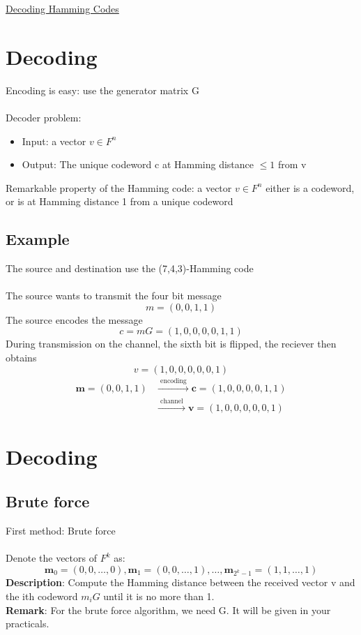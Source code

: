 \documentclass{article}[18pt]
\begin{document}
\begin{center}
\underline{\huge Decoding Hamming Codes}
\end{center}
\section{Decoding}
Encoding is easy: use the generator matrix G\\
\\
Decoder problem:
\begin{itemize}
	\item Input: a vector $v\in F^n$
	\item Output: The unique codeword c at Hamming distance $\leqslant 1$ from v
\end{itemize}
Remarkable property of the Hamming code: a vector $v\in F^n$ either is a codeword, or is at Hamming distance 1 from a unique codeword
\subsection{Example}
The source and destination use the (7,4,3)-Hamming code\\
\\
The source wants to transmit the four bit message
$$m=(0,0,1,1)$$
The source encodes the message
$$c=mG=(1,0,0,0,0,1,1)$$
During transmission on the channel, the sixth bit is flipped, the reciever then obtains
$$v=(1,0,0,0,0,0,1)$$
$$\begin{aligned} \mathbf { m } = ( 0,0,1,1 ) & \stackrel { \text { encoding } } { \longrightarrow } \mathbf { c } = ( 1,0,0,0,0,1,1 ) \\ & \stackrel { \text { channel } } { \longrightarrow } \mathbf { v } = ( 1,0,0,0,0,0,1 ) \end{aligned}$$
\section{Decoding}
\subsection{Brute force}
First method: Brute force\\
\\
Denote the vectors of $F^k$ as:
$$\mathbf { m } _ { 0 } = ( 0,0 , \ldots , 0 ) , \mathbf { m } _ { 1 } = ( 0,0 , \ldots , 1 ) , \ldots , \mathbf { m } _ { 2 ^ { k } - 1 } = ( 1,1 , \ldots , 1 )$$
\textbf{Description}: Compute the Hamming distance between the received vector v and the ith codeword $m_iG$ until it is no more than 1.\\
\textbf{Remark}: For the brute force algorithm, we need G. It will be given in your practicals.
\end{document}
